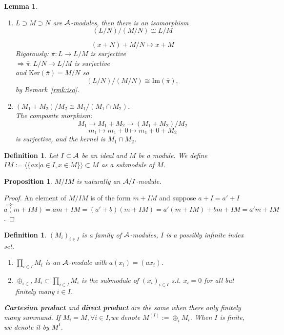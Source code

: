 \documentclass[11pt]{article}
\newtheorem{prop}[thm]{Proposition}
\newtheorem{lemma}[thm]{Lemma}
\newtheorem{dfn}[thm]{Definition}
\newcommand{\cala}{{\cal A}}
\newcommand{\rta}{\rightarrow}
\newcommand{\Lrta}{\Longrightarrow}
\newcommand{\lrta}{\longrightarrow}
\newcommand{\lgl}{\langle}
\newcommand{\rgl}{\rangle}
\begin{document}
\begin{lemma}\ 
\begin{enumerate}[label=(\roman*)]
    \item $L\supset M\supset N$ are $\cala$-modules, then there is an isomorphism 
    $$
        (L/N)/(M/N)\cong L/M
    $$

    $$
    (x+N)+M/N\mapsto x+M
    $$
    Rigorously:
    $\pi: L\lrta L/M$ is surjective\\
    $\Lrta \bar{\pi} :L/N\rta L/M$ is surjective\\
    and $\text{Ker}(\bar{\pi})=M/N$ so
     $$
     (L/N)/(M/N)\cong \text{Im}(\bar{\pi}),
     $$
     by Remark~\ref{rmk:iso}.
    \item $(M_1+M_2)/M_2\cong M_1/(M_1\cap M_2)$.\\
    The composite morphism:
    $$ 
    M_1\lrta M_1+M_2\lrta (M_1+M_2)/M_2
    $$ 
    $$
    m_1\longmapsto m_1+0\longmapsto m_1+0+ M_2
    $$
    is surjective, and the kernel is $M_1\cap M_2$.  
\end{enumerate}
\end{lemma}
\begin{dfn}Let 
$I\subset \cala$ be an ideal and $M$ be a module. We define $I M:=\lgl \{ax|a\in I,x\in M\}\rgl\subset M$ as a submodule of $M$.
\end{dfn}
\begin{prop}
$M/IM$ is naturally an $\cala/I$-module.
\end{prop}
\begin{proof} 
An element of $M/IM$ is of the form $m+ IM$ and suppose $a+I =a'+I$ $\Lrta $ $ a(m+ IM)= am+ IM=(a'+ b)(m+IM)=a'(m+ IM)+ bm+ IM=a'm+IM$.
\end{proof}
\begin{dfn}
$(M_i)_{i \in I}$ is a family of $\cala$-modules, $I$ is a possibly infinite index set.
\begin{enumerate}[label=(\roman*)]
\item $\prod_{i\in I} M_i$ is an $\cala$-module with $a(x_i)=(a x_i)$.
\item $\oplus_{i\in I} M_i\subset \prod_{i\in I} M_i$ is the submodule of $(x_i)_{i\in I}$ s.t. $x_i=0$ for all but finitely many $i\in I$. 
\end{enumerate}
\textbf{Cartesian product} and \textbf{direct product} are the same when there only finitely many summand. If $M_i=M,\forall i\in I$,we denote $M^{(I)}:=\oplus_i M_i$. When $I$ is finite, we denote it by $M^I$.
\end{dfn}
\end{document}

